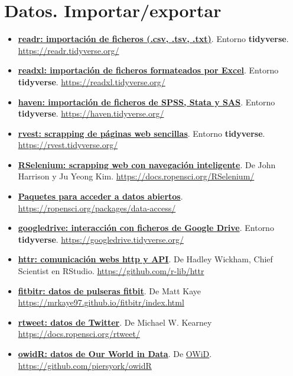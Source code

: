 \documentclass[11pt,]{book}
\begin{document}
\hypertarget{datos.-importarexportar}{%
\section*{Datos. Importar/exportar}\label{datos.-importarexportar}}


\begin{itemize}
\item
  \href{https://readr.tidyverse.org/}{\textbf{readr: importación de ficheros (.csv, .tsv, .txt)}}. Entorno \textbf{tidyverse}. \url{https://readr.tidyverse.org/}
\item
  \href{https://readxl.tidyverse.org/}{\textbf{readxl: importación de ficheros formateados por Excel}}. Entorno \textbf{tidyverse}. \url{https://readxl.tidyverse.org/}
\item
  \href{https://haven.tidyverse.org/}{\textbf{haven: importación de ficheros de SPSS, Stata y SAS}}. Entorno \textbf{tidyverse}. \url{https://haven.tidyverse.org/}
\item
  \href{https://rvest.tidyverse.org/}{\textbf{rvest: scrapping de páginas web sencillas}}. Entorno \textbf{tidyverse}. \url{https://rvest.tidyverse.org/}
\item
  \href{https://docs.ropensci.org/RSelenium/}{\textbf{RSelenium: scrapping web con navegación inteligente}}. De John Harrison y Ju Yeong Kim. \url{https://docs.ropensci.org/RSelenium/}
\item
  \href{https://ropensci.org/packages/data-access/}{\textbf{Paquetes para acceder a datos abiertos}}. \url{https://ropensci.org/packages/data-access/}
\item
  \href{https://googledrive.tidyverse.org/}{\textbf{googledrive: interacción con ficheros de Google Drive}}. Entorno \textbf{tidyverse}. \url{https://googledrive.tidyverse.org/}
\item
  \href{https://github.com/r-lib/httr}{\textbf{httr: comunicación webs http y API}}. De Hadley Wickham, Chief Scientist en RStudio. \url{https://github.com/r-lib/httr}
\item
  \href{https://mrkaye97.github.io/fitbitr/index.html}{\textbf{fitbitr: datos de pulseras fitbit}}. De Matt Kaye \url{https://mrkaye97.github.io/fitbitr/index.html}
\item
  \href{https://docs.ropensci.org/rtweet/}{\textbf{rtweet: datos de Twitter}}. De Michael W. Kearney \url{https://docs.ropensci.org/rtweet/}
\item
  \href{https://github.com/piersyork/owidR}{\textbf{owidR: datos de Our World in Data}}. De \href{https://ourworldindata.org/}{OWiD}. \url{https://github.com/piersyork/owidR}

\end{itemize}
\end{document}
